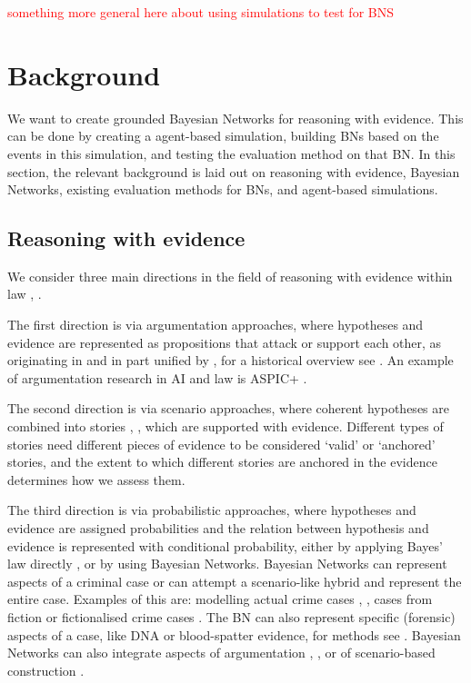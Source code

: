 \documentclass[12pt]{article}
\begin{document}
 
 \textcolor{red} {something more general here about using simulations to test for BNS}

\newpage

\section{Background}

We want to create grounded Bayesian Networks for reasoning with evidence. This can be done by creating a agent-based simulation, building BNs based on the events in this simulation, and testing the evaluation method on that BN. In this section, the relevant background is laid out on reasoning with evidence, Bayesian Networks, existing evaluation methods for BNs, and agent-based simulations.


\subsection{Reasoning with evidence}
We consider three main directions in the field of reasoning with evidence within law \citep{Verheij2015}, \citep{diBelloVerheij2018}. 

The first direction is via argumentation approaches, where hypotheses and evidence are represented as propositions that attack or support each other, as originating in \citep{wigmore1931} and in part unified by \citet{dung1995}, for a historical overview see \citep{benchcapon2019}. An example of argumentation research in AI and law is ASPIC+ \citep{prakkenEtal2013}. 

The second direction is via scenario approaches, where coherent hypotheses are combined into stories \citep{penningtonHastie1993}, \citep{wagenaar1993}, which are supported with evidence. Different types of stories need different pieces of evidence to be considered `valid' or `anchored' stories, and the extent to which different stories are anchored in the evidence determines how we assess them. 

The third direction is via probabilistic approaches, where hypotheses and evidence are assigned probabilities and the relation between hypothesis and evidence is represented with conditional probability, either by applying Bayes' law directly \citep{dahlman2020}, or by using Bayesian Networks. Bayesian Networks can represent aspects of a criminal case or can attempt a scenario-like hybrid and represent the entire case. Examples of this are: modelling actual crime cases \citep{kadaneSchum1996}, \citep{Fenton2019},  cases from fiction \citep{Fenton2012} or fictionalised crime cases \citep{vanLeeuwen2019}. The BN can also represent specific (forensic) aspects of a case, like DNA or blood-spatter evidence, for methods see \citep{Meester2021}. Bayesian Networks can also integrate aspects of argumentation \citep{wieten2019}, \citep{timmer2016}, or of scenario-based construction \citep{vlek2016}.
\end{document}
